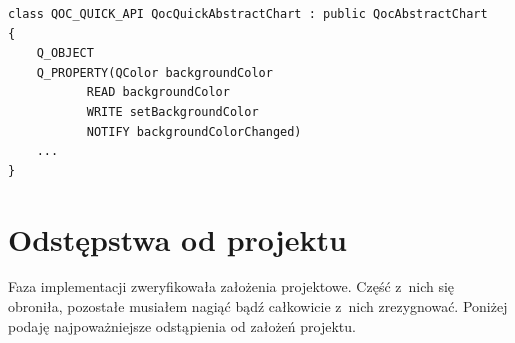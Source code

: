 \begin{lstlisting}[caption=Adapter klasy QocAbstractChart, label=code:qoc:adapter]
class QOC_QUICK_API QocQuickAbstractChart : public QocAbstractChart
{
	Q_OBJECT
	Q_PROPERTY(QColor backgroundColor 
		   READ backgroundColor 
		   WRITE setBackgroundColor 
		   NOTIFY backgroundColorChanged)
	...
}
\end{lstlisting}










\section{Odstępstwa od projektu}
Faza implementacji zweryfikowała założenia projektowe. Część z~nich się obroniła, pozostałe musiałem nagiąć bądź całkowicie z~nich zrezygnować. Poniżej podaję najpoważniejsze odstąpienia od założeń projektu.

